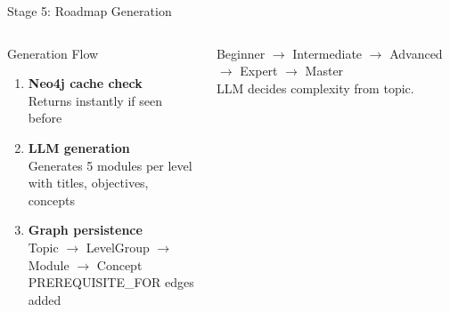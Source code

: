 \documentclass[aspectratio=169,9pt]{beamer}
\begin{document}
\begin{frame}{Stage 5: Roadmap Generation}
\begin{columns}[T]
  \begin{block}{Generation Flow}
    \begin{enumerate}
      \item \textbf{Neo4j cache check} \\
        Returns instantly if seen before
      \item \textbf{LLM generation} \\
        Generates 5 modules per level \\ with titles, objectives, concepts
      \item \textbf{Graph persistence} \\
        Topic $\to$ LevelGroup $\to$ Module $\to$ Concept \\
        PREREQUISITE\_FOR edges added
    \end{enumerate}
  \end{block}

  \vspace{0.2cm}
  \begin{keybox}[title={Extendable to 5 levels}]
    \small Beginner $\to$ Intermediate $\to$ Advanced $\to$ Expert $\to$ Master\\
    LLM decides complexity from topic.
  \end{keybox}
\end{columns}
\end{frame}
\end{document}
